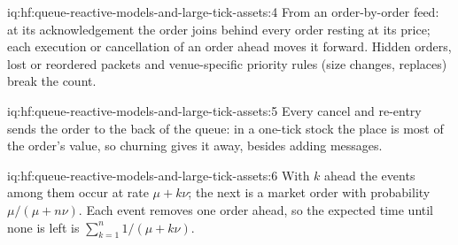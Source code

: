 \begin{solution}{iq:hf:queue-reactive-models-and-large-tick-assets:4}
From an order-by-order feed: at its acknowledgement the order joins behind every order resting at its price; each execution or cancellation of an
order ahead moves it forward. Hidden orders, lost or reordered packets and venue-specific priority rules (size changes, replaces) break the count.
\end{solution}

\begin{solution}{iq:hf:queue-reactive-models-and-large-tick-assets:5}
Every cancel and re-entry sends the order to the back of the queue: in a one-tick stock the place is most of the order's value, so churning gives it
away, besides adding messages.
\end{solution}

\begin{solution}{iq:hf:queue-reactive-models-and-large-tick-assets:6}
With $k$ ahead the events among them occur at rate $\mu+k\nu$; the next is a market order with probability $\mu/(\mu+n\nu)$. Each event removes one
order ahead, so the expected time until none is left is $\sum_{k=1}^n1/(\mu+k\nu)$.
\end{solution}
